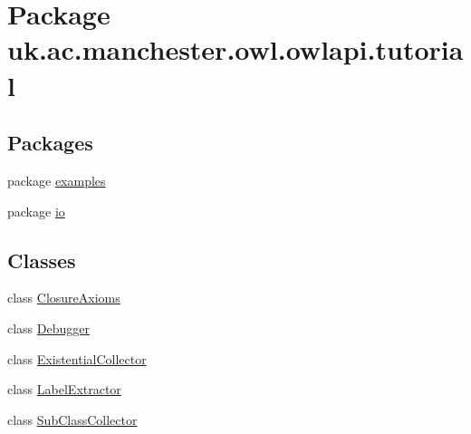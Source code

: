 \hypertarget{namespaceuk_1_1ac_1_1manchester_1_1owl_1_1owlapi_1_1tutorial}{\section{Package uk.\-ac.\-manchester.\-owl.\-owlapi.\-tutorial}
\label{namespaceuk_1_1ac_1_1manchester_1_1owl_1_1owlapi_1_1tutorial}
}
\subsection*{Packages}
\begin{DoxyCompactItemize}
\item 
package \hyperlink{namespaceuk_1_1ac_1_1manchester_1_1owl_1_1owlapi_1_1tutorial_1_1examples}{examples}
\item 
package \hyperlink{namespaceuk_1_1ac_1_1manchester_1_1owl_1_1owlapi_1_1tutorial_1_1io}{io}
\end{DoxyCompactItemize}
\subsection*{Classes}
\begin{DoxyCompactItemize}
\item 
class \hyperlink{classuk_1_1ac_1_1manchester_1_1owl_1_1owlapi_1_1tutorial_1_1_closure_axioms}{Closure\-Axioms}
\item 
class \hyperlink{classuk_1_1ac_1_1manchester_1_1owl_1_1owlapi_1_1tutorial_1_1_debugger}{Debugger}
\item 
class \hyperlink{classuk_1_1ac_1_1manchester_1_1owl_1_1owlapi_1_1tutorial_1_1_existential_collector}{Existential\-Collector}
\item 
class \hyperlink{classuk_1_1ac_1_1manchester_1_1owl_1_1owlapi_1_1tutorial_1_1_label_extractor}{Label\-Extractor}
\item 
class \hyperlink{classuk_1_1ac_1_1manchester_1_1owl_1_1owlapi_1_1tutorial_1_1_sub_class_collector}{Sub\-Class\-Collector}
\end{DoxyCompactItemize}
